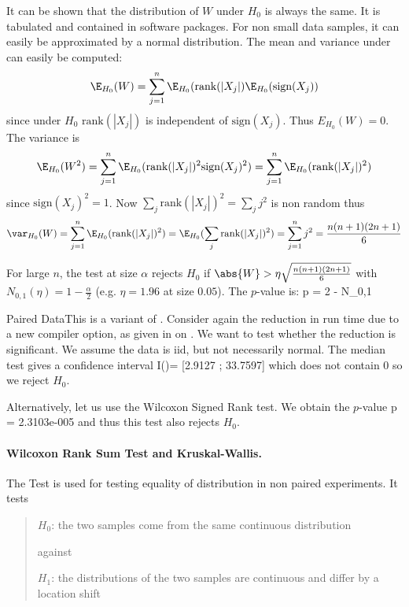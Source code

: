 It can be shown that the distribution of $W$ under $H_0$ is
always the same. It is tabulated and contained in software
packages. For non small data samples, it can easily be
approximated by a normal distribution. The mean and variance
under can easily be computed:
$$\E_{H_0}(W)=\sum_{j=1}^n \E_{H_0}(\mbox{rank}(|X_j|)\E_{H_0}(\mbox{sign}(X_j))$$ since under $H_0$
$\mbox{rank}(|X_j|)$ is independent of $\mbox{sign}(X_j)$.
Thus $E_{H_0}(W)=0$. The variance is
$$ \E_{H_0}(W^2)=\sum_{j=1}^n \E_{H_0}(\mbox{rank}(|X_j|)^2\mbox{sign}(X_j)^2)=
\sum_{j=1}^n \E_{H_0}(\mbox{rank}(|X_j|)^2)
$$since $\mbox{sign}(X_j)^2=1$. Now $\sum_j
\mbox{rank}(|X_j|)^2=\sum_j j^2$ is non random thus
$$\var_{H_0}(W)=\sum_{j=1}^n \E_{H_0}(\mbox{rank}(|X_j|)^2)=\E_{H_0}(\sum_j \mbox{rank}(|X_j|)^2
)=\sum_{j=1}^n j^2=\frac{n(n+1)(2n+1)}{6}$$

For large $n$, the test at size $\alpha$ rejects $H_0$ if
$\abs{W}
> \eta \sqrt{\frac{n(n+1)(2n+1)}{6}}$ with
$N_{0,1}(\eta)=1-\frac{\alpha}{2}$ (e.g. $\eta=1.96$ at size
$0.05$). The $p$-value is:
 \be
 p = 2  - N_{0,1}\lp
  \rp \rp
 \ee



\begin{exnn}{Paired Data}This is a variant of . Consider again
the reduction in run time due to a new compiler option, as given
in  on . We want to test
whether the reduction is significant. We assume the data is iid,
but not necessarily normal. The median test gives a confidence
interval
 \ben I({\vx})= [2.9127  ; 33.7597] \een
 which does not contain $0$ so we reject $H_0$.

 Alternatively, let us use the Wilcoxon Signed Rank test. We obtain the $p$-value
 \ben
p =   2.3103e-005 \een and thus this test also rejects $H_0$.
\end{exnn}

\paragraph{Wilcoxon Rank Sum Test and Kruskal-Wallis.}
The  Test is used for testing equality of
distribution in non paired experiments. It tests
 \begin{quote}
  $H_0$: the two samples come from the same continuous distribution

against

$H_1$: the distributions of the two samples are continuous and
differ by a location shift
 \end{quote}

